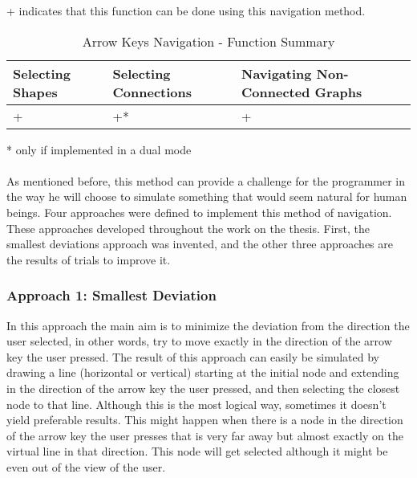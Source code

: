 \begin{table}[!htb]
\begin{center}
\begin{flushleft}
\footnotesize
{+ indicates that this function can be done using this navigation method.}\\
\normalsize
\end{flushleft}
	\begin{tabular}{| l | l | l |}
	\hline
	Selecting Shapes & Selecting Connections & Navigating Non-Connected Graphs \\ \hline
	+ & +* & + \\ \hline
	\end{tabular}
\begin{flushleft}
\footnotesize
{* only if implemented in a dual mode}
\end{flushleft} 
\caption{Arrow Keys Navigation - Function Summary}
\end{center}
\end{table}

\paragraph{}
As mentioned before, this method can provide a challenge for the programmer in the way he will choose to simulate something that would seem natural for human beings. Four approaches were defined to implement this method of navigation. These approaches developed throughout the work on the thesis. First, the smallest deviations approach was invented, and the other three approaches are the results of trials to improve it.


\subsubsection{Approach 1: Smallest Deviation}
In this approach the main aim is to minimize the deviation from the direction the user selected, in other words, try to move exactly in the direction of the arrow key the user pressed. The result of this approach can easily be simulated by drawing a line (horizontal or vertical) starting at the initial node and extending in the direction of the arrow key the user pressed, and then selecting the closest node to that line. Although this is the most logical way, sometimes it doesn't yield preferable results. This might happen when there is a node in the direction of the arrow key the user presses that is very far away but almost exactly on the virtual line in that direction. This node will get selected although it might be even out of the view of the user.

